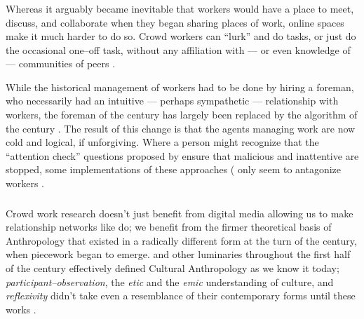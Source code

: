 \documentclass[trackingWork]{subfiles}
\begin{document}



\subsubsection{\whatchanged}
Whereas it arguably became inevitable that workers would have a place to
meet, discuss, and collaborate
when they began sharing places of work,
online spaces make it much harder to do so.
Crowd workers can ``lurk'' and do tasks, or just do the occasional one--off task,
without any affiliation with
--- or even knowledge of ---
communities of peers
\cite{miller2011understanding,mcinnis2016one,earl2011digitally}.

While the historical management of workers had to be done by hiring a foreman,
who necessarily had an intuitive
--- perhaps sympathetic ---
relationship with workers,
the foreman of the  century has largely been replaced
by the algorithm of the  century
\cite{uberAlgorithm}.
The result of this change is that the agents managing work are now
cold and logical, if unforgiving.
Where a person might recognize that the ``attention check'' questions 
proposed by \citeauthor{le2010ensuring} ensure that malicious and inattentive are stopped,
some implementations of these approaches
(\cite[see][]{MaliciousCrowdworkersGadiraju}
only seem to antagonize workers
\cite{le2010ensuring,MaliciousCrowdworkersGadiraju}.



\subsubsection{\implication}
Crowd work research doesn't just benefit from
digital media allowing us to make
relationship networks like \citeauthor{crowdcollab} do;
we benefit from the firmer theoretical basis of Anthropology that
existed in a radically different form at the turn of the  century,
when piecework began to emerge.
\citeauthor{malinowski2002argonauts,boas1940race,mead1973coming} and
other luminaries throughout the first half of the  century
effectively defined Cultural Anthropology as we know it today;
\textit{participant--observation},
the \textit{etic} and the \textit{emic} understanding of culture, and
\textit{reflexivity}
didn't take even a resemblance of their contemporary forms until these works
\cite{malinowski2002argonauts,boas1940race,mead1973coming}.
\end{document}
